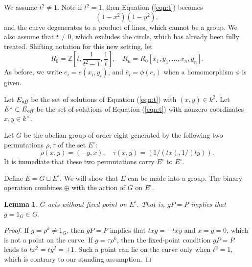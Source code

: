 \documentclass[12pt]{article}
\newtheorem{lemma}[theorem]{Lemma}
\newcommand{\ring}[1]{\mathbb{#1}}
\newcommand{\op}[1]{\hbox{#1}}
\newcommand{\Eaff}{E_{\op{\scriptsize\it aff}}}
\newcommand{\Eoo}{E^{\circ}}
\newcommand{\Go}{\langle\rho\rangle}
\begin{document}
We assume $t^2\ne 1$.  Note if $t^2=1$, then Equation (\ref{eqn:t})
becomes
\[
(1-x^2)(1-y^2),
\]
and the curve degenerates to a product of lines, which cannot be a
group.  We also assume that $t\ne 0$, which excludes the circle, which
has already been fully treated.  Shifting notation for this new
setting, let
\[
R_0 = \ring{Z}[t,\frac{1}{t^2-1},\frac1t],\quad
R_n = R_0[x_1,y_1,\ldots,x_n,y_n].
\]
As before, we write $e_i = e(x_i,y_i)$, and $\bar e_i = \phi(e_i)$ when a
homomorphism $\phi$ is given.

Let $\Eaff$ be the set of solutions of Equation (\ref{eqn:t}) with
$(x,y)\in k^2$.
Let $\Eoo\subset \Eaff$ be the set of solutions of Equation (\ref{eqn:t}) with
nonzero coordinates $x,y\in k^\times$.

Let $G$ be the abelian group of order eight generated by the following
two permutations $\rho,\tau$ of the set $\Eoo$:
\[
\rho(x,y) = (-y,x),\quad \tau(x,y) = (1/(tx),1/(ty)).
\]
It is immediate that these two permutations carry $\Eoo$ to $\Eoo$.

Define $E = G\sqcup \Eoo$.  We will show that $E$ can be made into a
group.  The binary operation 
combines $\oplus$ with the action of $G$ on $\Eoo$.



\begin{lemma}  \label{lemma:no-fix}
  $G$ acts without fixed point on $\Eoo$.  That is, $g P = P$ implies
  that $g=1_G\in G$.
\end{lemma}

\begin{proof} 
  If $g = \rho^k\ne 1_G$, then $g P = P$ implies that $t x y = - t x
  y$ and $x=y=0$, which is not a point on the curve.  If $g = \tau
  \rho^k$, then the fixed-point condition $g P = P$ leads to $t x^2 =
  t y^2 =\pm 1$.  Such a point can lie on the curve only when $t^2=1$,
  which is contrary to our standing assumption.
\end{proof}
\end{document}
